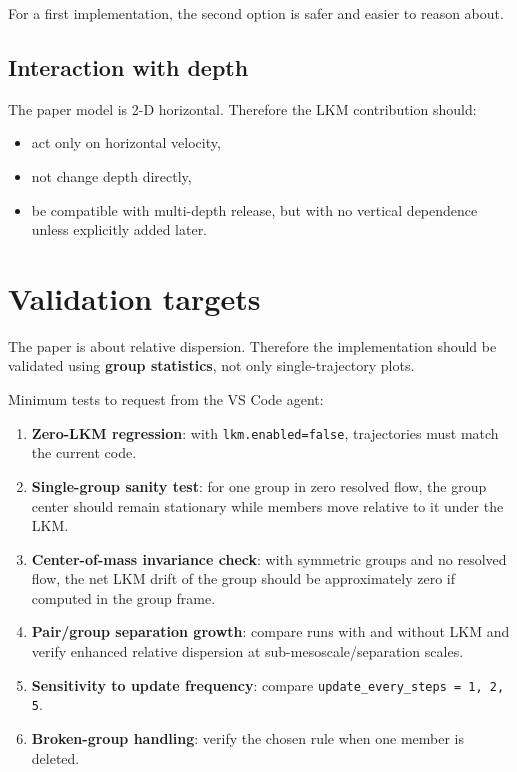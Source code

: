 \documentclass[11pt,a4paper]{article}
\begin{document}
	For a first implementation, the second option is safer and easier to reason about.
	
	\subsection{Interaction with depth}
	
	The paper model is 2-D horizontal. Therefore the LKM contribution should:
	\begin{itemize}[leftmargin=1.5em]
		\item act only on horizontal velocity,
		\item not change depth directly,
		\item be compatible with multi-depth release, but with no vertical dependence unless explicitly added later.
	\end{itemize}
	
	\section{Validation targets}
	
	The paper is about relative dispersion. Therefore the implementation should be validated using \textbf{group statistics}, not only single-trajectory plots.
	
	Minimum tests to request from the VS Code agent:
	\begin{enumerate}[label=\arabic*.]
		\item \textbf{Zero-LKM regression}: with \texttt{lkm.enabled=false}, trajectories must match the current code.
		\item \textbf{Single-group sanity test}: for one group in zero resolved flow, the group center should remain stationary while members move relative to it under the LKM.
		\item \textbf{Center-of-mass invariance check}: with symmetric groups and no resolved flow, the net LKM drift of the group should be approximately zero if computed in the group frame.
		\item \textbf{Pair/group separation growth}: compare runs with and without LKM and verify enhanced relative dispersion at sub-mesoscale/separation scales.
		\item \textbf{Sensitivity to update frequency}: compare \texttt{update\_every\_steps = 1, 2, 5}.
		\item \textbf{Broken-group handling}: verify the chosen rule when one member is deleted.
	\end{enumerate}
	
\end{document}
